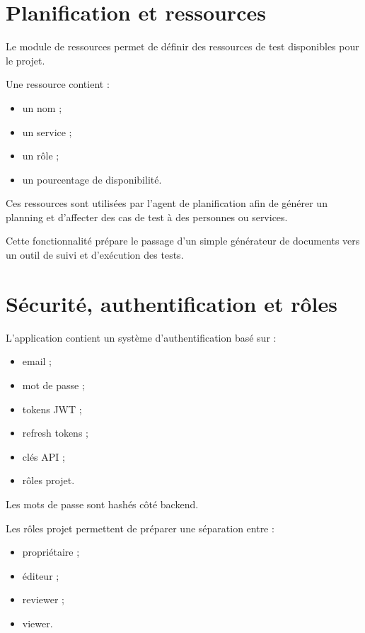 \documentclass[
  french,
]{report}
\providecommand{\tightlist}{%
  \setlength{\itemsep}{0pt}\setlength{\parskip}{0pt}}
\begin{document}
\chapter{Planification et
ressources}\label{planification-et-ressources}

Le module de ressources permet de définir des ressources de test
disponibles pour le projet.

Une ressource contient :

\begin{itemize}
\tightlist
\item
  un nom ;
\item
  un service ;
\item
  un rôle ;
\item
  un pourcentage de disponibilité.
\end{itemize}

Ces ressources sont utilisées par l'agent de planification afin de
générer un planning et d'affecter des cas de test à des personnes ou
services.

Cette fonctionnalité prépare le passage d'un simple générateur de
documents vers un outil de suivi et d'exécution des tests.

\chapter{Sécurité, authentification et
rôles}\label{suxe9curituxe9-authentification-et-ruxf4les}

L'application contient un système d'authentification basé sur :

\begin{itemize}
\tightlist
\item
  email ;
\item
  mot de passe ;
\item
  tokens JWT ;
\item
  refresh tokens ;
\item
  clés API ;
\item
  rôles projet.
\end{itemize}

Les mots de passe sont hashés côté backend.

Les rôles projet permettent de préparer une séparation entre :

\begin{itemize}
\tightlist
\item
  propriétaire ;
\item
  éditeur ;
\item
  reviewer ;
\item
  viewer.
\end{itemize}
\end{document}
